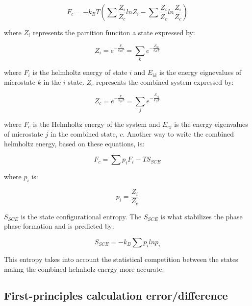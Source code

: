 \begin{equation}
\label{eq: combinedhelmholtz}
F_{c} = - k_{B} T \left( \sum \frac{Z_{i}}{Z_{c}} lnZ_{i} - \sum \frac{Z_{i}}{Z_{c}} ln \frac{Z_{i}}{Z_{c}}  \right) 
\end{equation}

\noindent where $Z_{i}$ represents the partition funciton a state expressed by:

\begin{equation}
\label{eq: zi}
Z_{i} = e^{- \frac{F_{i}}{k_{B}T}} = \sum_{k} e^{- \frac{E_{ik}}{k_{B}T}}
\end{equation}

\noindent where $F_{i}$ is the helmholtz energy of state $i$ and $E_{ik}$ is the energy eignevalues of microstate $k$ in the $i$ state. $Z_{c}$ represents the combined system expressed by:

\begin{equation}
\label{eq: zc}
Z_{c} = e^{-\frac{F_{c}}{k_{B}T}} = \sum_{j} e^{- \frac{E_{cj}}{k_{B}T}} 
\end{equation}

\noindent where $F_{c}$ is the Helmholtz energy of the system and $E_{cj}$ is the energy eigenvalues of microstate $j$ in the combined state, $c$. Another way to write the combined helmholtz energy, based on these equations, is:

\begin{equation}
\label{eq: combinedhelmholtz2}
F_{c} = \sum p_{i} F_{i} - TS_{SCE}
\end{equation}

\noindent where $p_{i}$ is:

\begin{equation}
\label{pi}
p_{i} = \frac{Z_{i}}{Z_{c}}
\end{equation}

\noindent $S_{SCE}$ is the state configurational entropy. The $S_{SCE}$ is what stabilizes the phase phase formation and is predicted by:

\begin{equation}
\label{SSCE}
S_{SCE} = -k_{B} \sum p_{i} lnp_{i}
\end{equation}

\noindent This entropy takes into account the statistical competition between the states makng the combined helmholz energy more accurate. 

\subsection{First-principles calculation error/difference}

